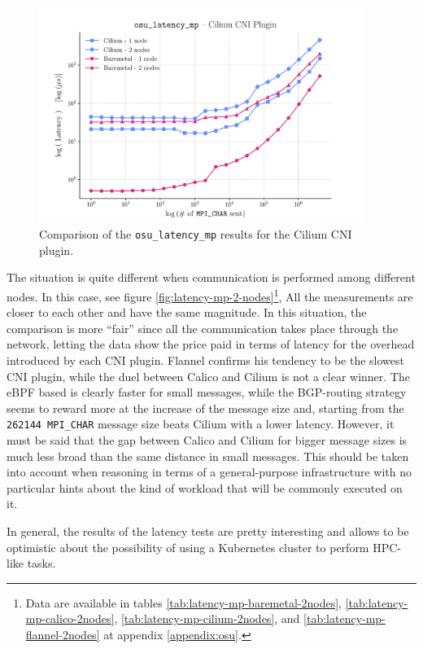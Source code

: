 \begin{figure}
  \centering
  \includegraphics[width=0.94\textwidth]{img/chpt3/cilium-latency_mp}
  \caption{Comparison of the \texttt{osu\_latency\_mp} results for the Cilium
    CNI plugin.}
  \label{fig:cilium-latency}
\end{figure}

The situation is quite different when communication is performed among different nodes.
In this case, see figure \ref{fig:latency-mp-2-nodes}\footnote{Data are available in tables
  \ref{tab:latency-mp-baremetal-2nodes}, \ref{tab:latency-mp-calico-2nodes},
  \ref{tab:latency-mp-cilium-2nodes}, and \ref{tab:latency-mp-flannel-2nodes} at
  appendix \ref{appendix:osu}.},
All the measurements are closer to each other and have the same magnitude.
In this situation, the comparison is more ``fair'' since all the communication
takes place through the network, letting the data show the price paid in terms
of latency for the overhead introduced by each CNI plugin.
Flannel confirms his tendency to be the slowest CNI plugin, while the duel
between Calico and Cilium is not a clear winner. The eBPF based is clearly
faster for small messages, while the BGP-routing strategy seems to reward more
at the increase of the message size and, starting from the \texttt{262144
  MPI\_CHAR} message size beats Cilium with a lower latency.
However, it must be said that the gap between Calico and Cilium for bigger
message sizes is much less broad than the same distance in small messages.
This should be taken into account when reasoning in terms of a general-purpose
infrastructure with no particular hints about the kind of workload that will be
commonly executed on it.

In general, the results of the latency tests are pretty interesting and
allows to be optimistic about the possibility of using a Kubernetes cluster to
perform HPC-like tasks.


